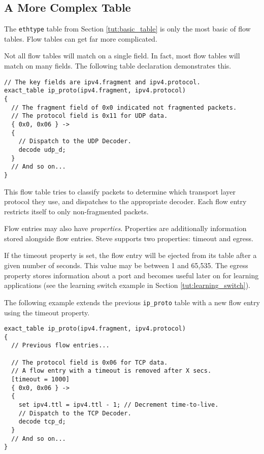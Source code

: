\subsection{A More Complex Table} \label{tut:complex_table}

The \texttt{ethtype} table from Section \ref{tut:basic_table} is only the most basic of flow tables. Flow tables can get
far more complicated.

Not all flow tables will match on a single field. In fact, most flow tables will
match on many fields. The following table declaration demonstrates this.

\begin{codepage}
\begin{lstlisting}
// The key fields are ipv4.fragment and ipv4.protocol.
exact_table ip_proto(ipv4.fragment, ipv4.protocol)
{
  // The fragment field of 0x0 indicated not fragmented packets.
  // The protocol field is 0x11 for UDP data.
  { 0x0, 0x06 } ->
  {
  	// Dispatch to the UDP Decoder.
  	decode udp_d;
  }
  // And so on...
}
\end{lstlisting}
\end{codepage}

This flow table tries to classify packets to determine which transport layer
protocol they use, and dispatches to the appropriate decoder.
Each flow entry restricts itself to only non-fragmented packets.

Flow entries may also have \textit{properties}. Properties are additionally
information stored alongside flow entries. Steve supports two properties:
timeout and egress.

If the timeout property is set, the flow entry will be ejected from its table
after a given number of seconds. This value may be between 1 and 65,535. The
egress property stores information about a port and becomes useful later on for learning
applications (see the learning switch example in Section
\ref{tut:learning_switch}).

The following example extends the previous \texttt{ip\_proto} table with a new flow entry using the timeout property.

\begin{codepage}
\begin{lstlisting}
exact_table ip_proto(ipv4.fragment, ipv4.protocol)
{
  // Previous flow entries...

  // The protocol field is 0x06 for TCP data.
  // A flow entry with a timeout is removed after X secs.
  [timeout = 1000]
  { 0x0, 0x06 } ->
  {
  	set ipv4.ttl = ipv4.ttl - 1; // Decrement time-to-live.
  	// Dispatch to the TCP Decoder.
  	decode tcp_d;
  }
  // And so on...
}
\end{lstlisting}
\end{codepage}

